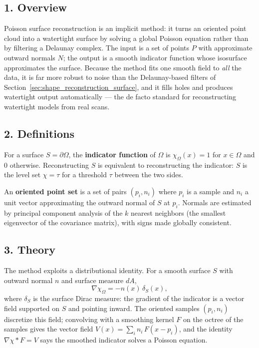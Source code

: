 \subsection{1. Overview}

Poisson surface reconstruction \cite{kazhdan2006}
is an implicit method: it turns an oriented point cloud into a watertight
surface by solving a global Poisson equation rather than by filtering a
Delaunay complex. The input is a set of points $P$ with approximate outward
normals $N$; the output is a smooth indicator function whose isosurface
approximates the surface. Because the method fits one smooth field to
\emph{all} the data, it is far more robust to noise than the Delaunay-based
filters of Section~\ref{sec:shape_reconstruction_surface}, and it fills holes
and produces watertight output automatically --- the de facto standard for
reconstructing watertight models from real scans.

\subsection{2. Definitions}

\begin{definition}\label{def:shape_indicator}
  For a surface $S = \partial\Omega$, the \textbf{indicator function} of
  $\Omega$ is $\chi_{\Omega}(x) = 1$ for $x \in \Omega$ and $0$ otherwise.
  Reconstructing $S$ is equivalent to reconstructing the indicator: $S$ is the
  level set $\chi = \tau$ for a threshold $\tau$ between the two sides.
\end{definition}

\begin{definition}\label{def:shape_oriented_points}
  An \textbf{oriented point set} is a set of pairs $(p_i, n_i)$ where $p_i$ is
  a sample and $n_i$ a unit vector approximating the outward normal of $S$ at
  $p_i$. Normals are estimated by principal component analysis of the $k$
  nearest neighbors (the smallest eigenvector of the covariance matrix), with
  signs made globally consistent.
\end{definition}

\subsection{3. Theory}

The method exploits a distributional identity. For a smooth surface $S$ with
outward normal $n$ and surface measure $dA$,
\[
\nabla \chi_{\Omega} = -n(x)\,\delta_S(x),
\]
where $\delta_S$ is the surface Dirac measure: the gradient of the indicator
is a vector field supported on $S$ and pointing inward. The oriented samples
$(p_i, n_i)$ discretize this field; convolving with a smoothing kernel $F$ on
the octree of the samples gives the vector field
$V(x) = \sum_i n_i\,F(x - p_i)$, and the identity
$\nabla \chi * F = V$ says the smoothed indicator solves a Poisson equation.

